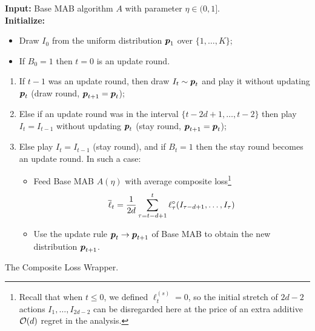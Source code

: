 \begin{algorithm2e}[t]
 
\textbf{Input:}  Base MAB algorithm $A$ with parameter $\eta \in (0,1]$.\\%
\textbf{Initialize:}
\begin{itemize}[topsep=0pt,parsep=0pt,itemsep=0pt]
\item Draw $I_0$ from the uniform distribution $\boldsymbol{p}_1$ over $\{1,\ldots,K\}$;
\item If $B_0 = 1$ then $t=0$ is an update round.
\end{itemize}
%
 { {
\begin{enumerate}[topsep=0pt,parsep=0pt,itemsep=0pt]
\item If $t-1$ was an update round, then draw $I_t \sim \boldsymbol{p}_t$ and play it without updating $\boldsymbol{p}_t$ (draw round, $\boldsymbol{p}_{t+1} = \boldsymbol{p}_t$);
\item Else if an update round was in the interval $\{t-2d+1, \dots,t-2\}$ then play $I_t = I_{t-1}$ without updating $\boldsymbol{p}_t$
(stay round, $\boldsymbol{p}_{t+1} = \boldsymbol{p}_t$);
\item Else play $I_t = I_{t-1}$ (stay round), and if $B_t=1$ then the stay round becomes an update round. In such a case:
%
\begin{minipage}{\textwidth-50pt}
\begin{itemize}
\vspace{0.05in}
\item Feed Base MAB $A(\eta)$ with average composite loss\footnote
{
Recall that when $t \leq 0$, we defined $\ell^{(s)}_{t} =0$, so the initial stretch of $2d-2$ actions $I_1,\ldots,I_{2d-2}$ can be disregarded here at the price of an extra additive $\mathcal{O}(d)$ regret in the analysis.
}
%
\[
{\overline{\ell}}_t = \frac{1}{2d}\sum_{\tau=t-d+1}^t \ell^{\circ}_\tau(I_{\tau-d+1},\dots,I_{\tau})
\]
\item Use the update rule $\boldsymbol{p}_t\rightarrow \boldsymbol{p}_{t+1}$ of Base MAB to obtain the new distribution $\boldsymbol{p}_{t+1}$.
\end{itemize}
\end{minipage}
\end{enumerate}
} } \caption{The Composite Loss Wrapper.}
\label{a:delayed-app}
\end{algorithm2e}
